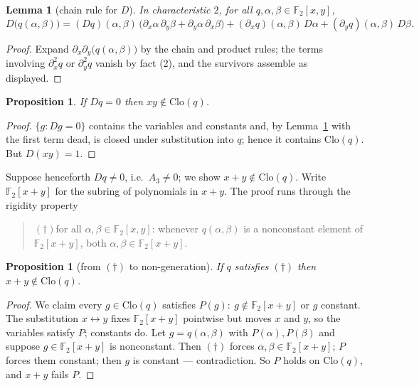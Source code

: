 \documentclass[11pt]{article}
\newtheorem{lemma}[theorem]{Lemma}
\newtheorem{proposition}[theorem]{Proposition}
\theoremstyle{definition}
\newcommand{\F}{\mathbb{F}}
\newcommand{\Clo}{\mathrm{Clo}}
\begin{document}
\begin{lemma}[chain rule for $D$]\label{lem:cocycle}
In characteristic $2$, for all $q, \alpha, \beta \in \F_2[x,y]$,
\[
  D\bigl(q(\alpha,\beta)\bigr)
  = (Dq)(\alpha,\beta)\,
      \bigl(\partial_x\alpha\,\partial_y\beta
            + \partial_y\alpha\,\partial_x\beta\bigr)
  + (\partial_x q)(\alpha,\beta)\, D\alpha
  + (\partial_y q)(\alpha,\beta)\, D\beta .
\]
\end{lemma}

\begin{proof}
Expand $\partial_x\partial_y\bigl(q(\alpha,\beta)\bigr)$ by the chain
and product rules; the terms involving $\partial_x^2 q$ or
$\partial_y^2 q$ vanish by fact (2), and the survivors assemble as
displayed.
\end{proof}

\begin{proposition}\label{prop:Dzero}
If $Dq = 0$ then $xy \notin \Clo(q)$.
\end{proposition}

\begin{proof}
$\{g : Dg = 0\}$ contains the variables and constants and, by
Lemma~\ref{lem:cocycle} with the first term dead, is closed under
substitution into $q$; hence it contains $\Clo(q)$.  But
$D(xy) = 1$.
\end{proof}

Suppose henceforth $Dq \neq 0$, i.e.\ $A_3 \neq 0$; we show
$x + y \notin \Clo(q)$.  Write $\F_2[x{+}y]$ for the subring of
polynomials in $x+y$.  The proof runs through the rigidity property
\begin{quote}
  $(\dagger)$\quad for all $\alpha, \beta \in \F_2[x,y]$: whenever
  $q(\alpha,\beta)$ is a nonconstant element of $\F_2[x{+}y]$, both
  $\alpha, \beta \in \F_2[x{+}y]$.
\end{quote}

\begin{proposition}[from $(\dagger)$ to non-generation]\label{prop:master}
If $q$ satisfies $(\dagger)$ then $x + y \notin \Clo(q)$.
\end{proposition}

\begin{proof}
We claim every $g \in \Clo(q)$ satisfies
$P(g):\ g \notin \F_2[x{+}y]$ or $g$ constant.  The substitution
$x \leftrightarrow y$ fixes $\F_2[x{+}y]$ pointwise but moves $x$ and
$y$, so the variables satisfy $P$; constants do.  Let
$g = q(\alpha,\beta)$ with $P(\alpha), P(\beta)$ and suppose
$g \in \F_2[x{+}y]$ is nonconstant.  Then $(\dagger)$ forces
$\alpha, \beta \in \F_2[x{+}y]$; $P$ forces them constant; then $g$
is constant --- contradiction.  So $P$ holds on $\Clo(q)$, and
$x + y$ fails $P$.
\end{proof}
\end{document}
